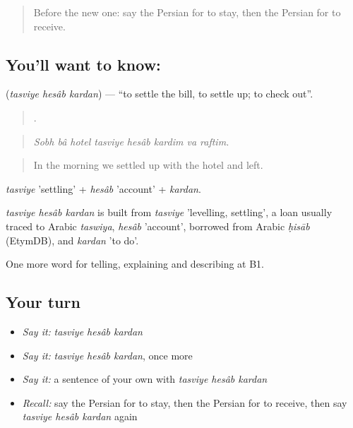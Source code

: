 \begin{quote}
Before the new one: say the Persian for to stay, then the Persian for to receive.
\end{quote}

\subsection*{You'll want to know:   }
\textbf{  } (\emph{tasviye hesâb kardan}) — \textquotedblleft{}to settle the bill, to settle up; to check out\textquotedblright{}.

\begin{quote}
       .
\end{quote}

\begin{quote}
\emph{Sobh bâ hotel tasviye hesâb kardim va raftim.}
\end{quote}

\begin{quote}
In the morning we settled up with the hotel and left.
\end{quote}

\emph{tasviye} 'settling' + \emph{hesâb} 'account' + \emph{kardan}.

\begin{cousinweb}
\emph{tasviye hesâb kardan} is built from \emph{tasviye} 'levelling, settling', a loan usually traced to Arabic \emph{taswiya}, \emph{hesâb} 'account', borrowed from Arabic \emph{ḥisāb} (EtymDB), and \emph{kardan} 'to do'.
\end{cousinweb}

\begin{grammarlens}[title={What you've built}]
One more word for telling, explaining and describing at B1.
\end{grammarlens}

\subsection*{Your turn}
\begin{itemize}
\raggedright
  \item \emph{Say it:} \emph{tasviye hesâb kardan}
  \item \emph{Say it:} \emph{tasviye hesâb kardan}, once more
  \item \emph{Say it:} a sentence of your own with \emph{tasviye hesâb kardan}
  \item \emph{Recall:} say the Persian for to stay, then the Persian for to receive, then say \emph{tasviye hesâb kardan} again
\end{itemize}

